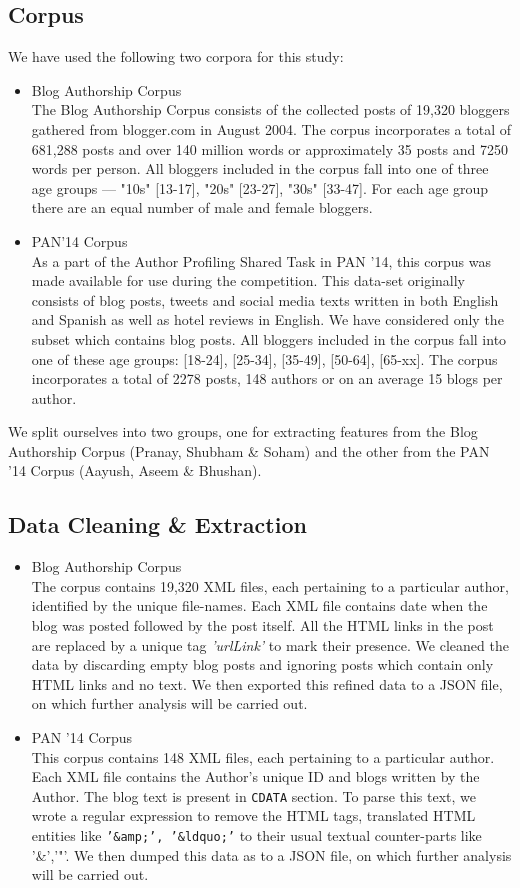 \documentclass{sig-alternate}
\begin{document}
\subsection{Corpus}
We have used the following two corpora for this study:
\begin{itemize}
\item Blog Authorship Corpus\\
The Blog Authorship Corpus consists of the collected posts of 19,320 bloggers gathered from blogger.com in August 2004. The corpus incorporates a total of 681,288 posts and over 140 million words or approximately 35 posts and 7250 words per person. All bloggers included in the corpus fall into one of three age groups --- "10s" [13-17], "20s" [23-27], "30s" [33-47].
For each age group there are an equal number of male and female bloggers.   
\item PAN'14 Corpus\\
As a part of the Author Profiling Shared Task in PAN '14, this corpus was made available for use during the competition. This data-set originally consists of blog posts, tweets and social media texts written in both English and Spanish as well as hotel reviews in English. We have considered only the subset which contains blog posts. All bloggers included in the corpus fall into one of these age groups: [18-24], [25-34], [35-49], [50-64], [65-xx].
The corpus incorporates a total of 2278 posts, 148 authors or on an average 15 blogs per author. 
\end{itemize}
We split ourselves into two groups, one for extracting features from the Blog Authorship Corpus (Pranay, Shubham \& Soham) and the other from the PAN '14 Corpus (Aayush, Aseem \& Bhushan).  
\subsection{Data Cleaning \& Extraction}
\begin{itemize}
\item Blog Authorship Corpus\\
The corpus contains 19,320 XML files, each pertaining to a particular author, identified by the unique file-names. Each XML file contains date when the blog was posted followed by the post itself. All the HTML links in the post are replaced by a unique tag \textit{'urlLink'} to mark their presence. We cleaned the data by discarding empty blog posts and ignoring posts which contain only HTML links and no text. We then exported this refined data to a JSON file, on which further analysis will be carried out.
\item PAN '14 Corpus\\
This corpus contains 148 XML files, each pertaining to a particular author. Each XML file contains the Author's unique ID and blogs written by the Author. The blog text is present in \texttt{CDATA} section. To parse this text, we wrote a regular expression to remove the HTML tags, translated HTML entities like \texttt{'\&amp;', '\&ldquo;'} to their usual textual counter-parts like '\&','"'. We then dumped this data as to a JSON file, on which further analysis will be carried out.
\end{itemize}
\end{document}
